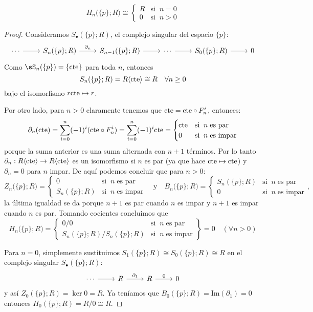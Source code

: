 \documentclass[../../topologia_algebraica]{subfiles}
\begin{document}
\begin{prop}\label{prop:homologia_punto}
  \[
    H_n\big(\{p\};R\big)\cong%
    \begin{cases}
      R & \text{si}\;\; n=0 \\
      0 & \text{si}\;\; n>0
    \end{cases}
  \]
\end{prop}
\begin{proof}
  Consideramos $S_{\bullet}(\{p\};R)$, el complejo singular del espacio $\{p\}$:
  \[
    \begin{tikzcd}
      \cdots \arrow[r] & S_n(\{p\};R) \arrow[r,"\partial_n"] & S_{n-1}(\{p\};R) \arrow[r] &
      \cdots \arrow[r] & S_0(\{p\};R) \arrow[r] & 0
    \end{tikzcd}
  \]
  Como $\sS_n(\{p\})=\{\cte\}$ para toda $n$, entonces
  \[
    S_n(\{p\};R)=R\langle \text{cte} \rangle\cong R \quad\forall n\geq 0
  \]
  bajo el isomorfismo $r\text{cte}\mapsto r$.
  
  Por otro lado, para $n>0$ claramente tenemos que $\text{cte}=\text{cte}\circ F^i_n$, entonces:
  \[
    \partial_n(\cte)=\sum_{i=0}^n (-1)^i (\cte\circ F_n^i)=\sum_{i=0}^n (-1)^i \cte=%
    \begin{cases}
      \cte & \text{si}\;\; n\;\text{es par}\\
      0 & \text{si}\;\; n\;\text{es impar}
    \end{cases}
  \]
  porque la suma anterior es una suma alternada con $n+1$ t\'erminos. Por lo tanto
  $\partial_n:R\langle \text{cte} \rangle\rightarrow R\langle \text{cte} \rangle$ es un isomorfismo si $n$ es par (ya que hace
  $\text{cte}\mapsto\text{cte}$) y $\partial_n=0$ para $n$ impar. De aqu\'i podemos concluir que para $n>0$:
  \[
    Z_n\big(\{p\};R\big)=
    \begin{cases}
      0 & \text{si}\;\; n\;\text{es par}\\
      S_n(\{p\};R) & \text{si}\;\; n\;\text{es impar}
    \end{cases} \quad\text{y}\quad
    B_n\big(\{p\};R\big)=
    \begin{cases}
      S_n(\{p\};R) & \text{si}\;\; n\;\text{es par}\\
      0 & \text{si}\;\; n\;\text{es impar}
    \end{cases},
  \]
  la \'ultima igualdad se da porque $n+1$ es par cuando $n$ es impar y $n+1$ es impar cuando
  $n$ es par. Tomando cocientes concluimos que
  \[
    H_n\big(\{p\};R\big)=\left.
      \begin{cases}
        0/0 & \text{si}\;\; n\;\text{es par}\\
        S_n(\{p\};R)/S_n(\{p\};R) & \text{si}\;\; n\;\text{es impar}
      \end{cases}\right\} = 0 \quad (\forall n>0)
  \]
  
  Para $n=0$, simplemente sustituimos $S_1(\{p\};R)\cong S_0(\{p\};R)\cong R$ en el complejo
  singular $S_{\bullet}(\{p\};R)$:
  \[
    \begin{tikzcd}
      \cdots \arrow[r] & R \arrow[r,"\partial_1"] & R \arrow[r,"0"] & 0
    \end{tikzcd}
  \]
  y as\'i $Z_0(\{p\};R)=\ker 0=R$. Ya ten\'iamos que $B_0(\{p\};R)=\text{Im}(\partial_1)=0$
  entonces $H_0(\{p\};R)=R/0\cong R$.
\end{proof}
	
\end{document}
